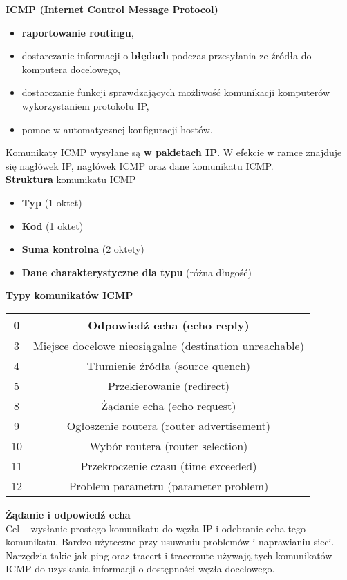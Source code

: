 \documentclass[../main.tex]{subfiles}
\begin{document}
    \textbf{ICMP (Internet Control Message Protocol)}
    \begin{itemize}
        \item \textbf{raportowanie routingu},
        \item dostarczanie informacji o \textbf{błędach} podczas przesyłania ze źródła do komputera docelowego,
        \item dostarczanie funkcji sprawdzających możliwość komunikacji komputerów wykorzystaniem protokołu IP,
        \item pomoc w automatycznej konfiguracji hostów.
    \end{itemize}
    Komunikaty ICMP wysyłane są \textbf{w pakietach IP}. W efekcie w ramce znajduje się nagłówek IP, nagłówek ICMP oraz dane komunikatu ICMP.\\

    \textbf{Struktura} komunikatu ICMP
    \begin{itemize}
        \item \textbf{Typ} (1 oktet)
        \item \textbf{Kod} (1 oktet)
        \item \textbf{Suma kontrolna} (2 oktety)
        \item \textbf{Dane charakterystyczne dla typu} (różna długość)
    \end{itemize}

    \textbf{Typy komunikatów ICMP}
    \begin{tabular}{|c|c|}
        \hline
        0 & Odpowiedź echa (echo reply)\\
        \hline
        3 & Miejsce docelowe nieosiągalne (destination unreachable)\\
        \hline
        4 & Tłumienie źródła (source quench)\\
        \hline
        5 & Przekierowanie (redirect)\\
        \hline
        8 & Żądanie echa (echo request)\\
        \hline
        9 & Ogłoszenie routera (router advertisement)\\
        \hline
        10 & Wybór routera (router selection)\\
        \hline
        11 & Przekroczenie czasu (time exceeded)\\
        \hline
        12 & Problem parametru (parameter problem)\\
        \hline
    \end{tabular}

    \textbf{Żądanie i odpowiedź echa}\\
    Cel – wysłanie prostego komunikatu do węzła IP i odebranie echa tego komunikatu. Bardzo
    użyteczne przy usuwaniu problemów i naprawianiu sieci. Narzędzia takie jak ping oraz tracert i traceroute używają tych komunikatów ICMP do
    uzyskania informacji o dostępności węzła docelowego.\\
\end{document}
